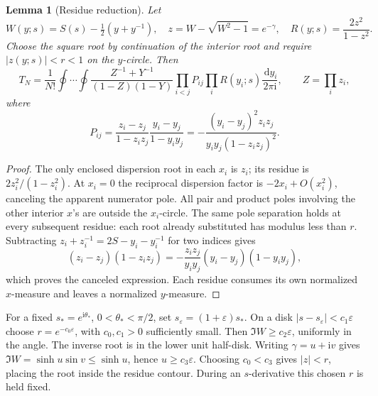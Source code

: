 \documentclass[11pt]{article}
\numberwithin{equation}{section}
\newtheorem{lemma}[theorem]{Lemma}
\theoremstyle{definition}
\newcommand{\dd}{\,\mathrm d}
\newcommand{\ii}{\mathrm i}
\newcommand{\eps}{\varepsilon}
\newcommand{\sstar}{s_*}
\newcommand{\se}{s_\varepsilon}
\begin{document}
\begin{lemma}[Residue reduction]\label{lem:residue}
Let
\[
 W(y;s)=S(s)-\tfrac12(y+y^{-1}),\quad
 z=W-\sqrt{W^2-1}=e^{-\gamma},\quad
 R(y;s)=\frac{2z^2}{1-z^2}.
\]
Choose the square root by continuation of the interior root and require
\(\lvert z(y;s)\rvert<r<1\) on the \(y\)-circle. Then
\begin{equation}
 T_N=\frac1{N!}\oint\cdots\oint
 \frac{Z^{-1}+Y^{-1}}{(1-Z)(1-Y)}
 \prod_{i<j}P_{ij}\prod_i R(y_i;s)\frac{\dd y_i}{2\pi\ii},
 \qquad Z=\prod_i z_i,\label{eq:reduced}
\end{equation}
where
\begin{equation}
 P_{ij}=\frac{z_i-z_j}{1-z_iz_j}\frac{y_i-y_j}{1-y_iy_j}
       =-\frac{(y_i-y_j)^2z_iz_j}{y_iy_j(1-z_iz_j)^2}.
 \label{eq:pair}
\end{equation}
\end{lemma}
\begin{proof}
The only enclosed dispersion root in each \(x_i\) is \(z_i\);
its residue is \(2z_i^2/(1-z_i^2)\). At \(x_i=0\) the reciprocal dispersion
factor is \(-2x_i+O(x_i^2)\), canceling the apparent numerator pole.
All pair and product poles involving the other interior \(x\)'s are
outside the \(x_i\)-circle. The same pole separation holds at every subsequent residue: each root
already substituted has modulus less than \(r\).
Subtracting \(z_i+z_i^{-1}=2S-y_i-y_i^{-1}\) for two indices gives
\[
 (z_i-z_j)(1-z_iz_j)
 =-\frac{z_iz_j}{y_iy_j}(y_i-y_j)(1-y_iy_j),
\]
which proves the canceled expression. Each residue consumes its own
normalized \(x\)-measure and leaves a normalized \(y\)-measure.
\end{proof}

For a fixed \(\sstar=e^{\ii\theta_*}\), \(0<\theta_*<\pi/2\), set
\(\se=(1+\eps)\sstar\). On a disk \(\lvert s-\se\rvert<c_1\eps\)
choose \(r=e^{-c_0\eps}\), with \(c_0,c_1>0\) sufficiently small.
Then \(\Im W\ge c_2\eps\), uniformly in the angle. The inverse root is
in the lower unit half-disk. Writing \(\gamma=u+\ii v\) gives
\(\Im W=\sinh u\sin v\le\sinh u\), hence \(u\ge c_3\eps\).
Choosing \(c_0<c_3\) gives \(|z|<r\), placing the root inside the
residue contour.
During an \(s\)-derivative this chosen \(r\) is held fixed.
\end{document}
